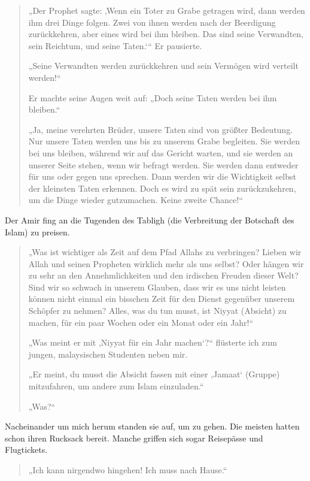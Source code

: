 \documentclass[12pt]{memoir}
\begin{document}
\begin{quote}
„Der Prophet sagte: ‚Wenn ein Toter zu Grabe getragen wird,
dann werden ihm drei Dinge folgen.
Zwei von ihnen werden nach der Beerdigung zurückkehren,
aber eines wird bei ihm bleiben.
Das sind seine Verwandten, sein Reichtum, und seine Taten.‘“
Er pausierte.

„Seine Verwandten werden zurückkehren und sein Vermögen wird verteilt werden!“

Er machte seine Augen weit auf: „Doch seine Taten werden bei ihm bleiben.“

„Ja, meine verehrten Brüder, unsere Taten sind von größter Bedeutung.
Nur unsere Taten werden uns bis zu unserem Grabe begleiten.
Sie werden bei uns bleiben, während wir auf das Gericht warten,
und sie werden an unserer Seite stehen, wenn wir befragt werden.
Sie werden dann entweder für uns oder gegen uns sprechen.
Dann werden wir die Wichtigkeit selbst der kleinsten Taten erkennen.
Doch es wird zu spät sein zurückzukehren, um die Dinge wieder gutzumachen.
Keine zweite Chance!“
\end{quote}

Der Amir fing an die Tugenden des Tabligh
(die Verbreitung der Botschaft des Islam) zu preisen.

\begin{quote}
„Was ist wichtiger als Zeit auf dem Pfad Allahs zu verbringen?
Lieben wir Allah und seinen Propheten wirklich mehr als uns selbst?
Oder hängen wir zu sehr an den Annehmlichkeiten
und den irdischen Freuden dieser Welt?
Sind wir so schwach in unserem Glauben,
dass wir es uns nicht leisten können nicht einmal ein bisschen Zeit
für den Dienst gegenüber unserem Schöpfer zu nehmen?
Alles, was du tun musst, ist Niyyat (Absicht) zu machen,
für ein paar Wochen oder ein Monat oder ein Jahr!“

„Was meint er mit ‚Niyyat für ein Jahr machen‘?“
flüsterte ich zum jungen, malaysischen Studenten neben mir.

„Er meint, du musst die Absicht fassen
mit einer ‚Jamaat‘ (Gruppe) mitzufahren, um andere zum Islam einzuladen.“

„Was?“
\end{quote}

Nacheinander um mich herum standen sie auf, um zu gehen.
Die meisten hatten schon ihren Rucksack bereit.
Manche griffen sich sogar Reisepässe und Flugtickets.

\begin{quote}
„Ich kann nirgendwo hingehen! Ich muss nach Hause.“
\end{quote}
\end{document}
